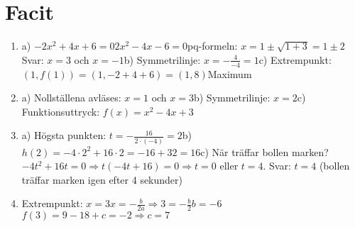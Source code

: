 \documentclass[a4paper,11pt]{article}
\begin{document}
\newpage
\section*{Facit}
\begin{enumerate}[label=\textbf{\arabic*.}]
    \item a) $-2x^2 + 4x + 6 = 0$\newline $2x^2 - 4x - 6 = 0$\newline pq-formeln: $x = 1 \pm \sqrt{1+3} = 1 \pm 2$\newline Svar: $x=3$ och $x=-1$\newline b) Symmetrilinje: $x = -\frac{4}{-4} = 1$\newline c) Extrempunkt: $(1, f(1)) = (1, -2+4+6) = (1, 8)$\newline Maximum
    \item a) Nollställena avläses: $x=1$ och $x=3$\newline b) Symmetrilinje: $x=2$\newline c) Funktionsuttryck: $f(x) = x^2 - 4x + 3$
    \item a) Högsta punkten: $t = -\frac{16}{2\cdot(-4)} = 2$\newline b) $h(2) = -4\cdot2^2 + 16\cdot2 = -16 + 32 = 16$\newline c) När träffar bollen marken? $-4t^2 + 16t = 0 \Rightarrow t(-4t + 16) = 0 \Rightarrow t=0$ eller $t=4$. Svar: $t=4$ (bollen träffar marken igen efter 4 sekunder)
    \item Extrempunkt: $x=3$\newline $x = -\frac{b}{2a} \Rightarrow 3 = -\frac{b}{2}$\newline $b = -6$\newline $f(3) = 9 - 18 + c = -2 \Rightarrow c = 7$
\end{enumerate}
\end{document}
